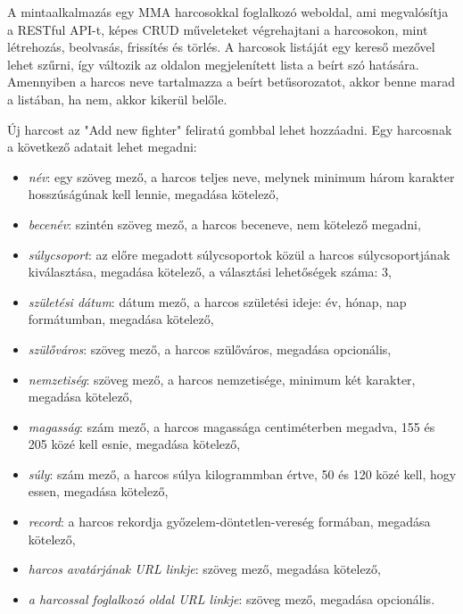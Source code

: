 





A mintaalkalmazás egy MMA harcosokkal foglalkozó weboldal, ami megvalósítja a RESTful API-t, képes CRUD műveleteket végrehajtani a harcosokon, mint létrehozás, beolvasás, frissítés és törlés. A harcosok listáját egy kereső mezővel lehet szűrni, így változik az oldalon megjelenített lista a beírt szó hatására. Amennyiben a harcos neve tartalmazza a beírt betűsorozatot, akkor benne marad a listában, ha nem, akkor kikerül belőle.

Új harcost az "Add new fighter" feliratú gombbal lehet hozzáadni. Egy harcosnak a következő adatait lehet megadni:

\begin{itemize}
\item \textit{név}: egy szöveg mező, a harcos teljes neve, melynek minimum három karakter hosszúságúnak kell lennie, megadása kötelező,
\item \textit{becenév}: szintén szöveg mező, a harcos beceneve, nem kötelező megadni,
\item \textit{súlycsoport}: az előre megadott súlycsoportok közül a harcos súlycsoportjának kiválasztása, megadása kötelező, a választási lehetőségek száma: 3,
\item \textit{születési dátum}: dátum mező, a harcos születési ideje: év, hónap, nap formátumban, megadása kötelező,
\item \textit{szülőváros}: szöveg mező, a harcos szülőváros, megadása opcionális,
\item \textit{nemzetiség}: szöveg mező, a harcos nemzetisége, minimum két karakter, megadása kötelező,
\item \textit{magasság}: szám mező, a harcos magassága centiméterben megadva, 155 és 205 közé kell esnie, megadása kötelező,
\item \textit{súly}: szám mező, a harcos súlya kilogrammban értve, 50 és 120 közé kell, hogy essen, megadása kötelező,
\item \textit{record}: a harcos rekordja győzelem-döntetlen-vereség formában, megadása kötelező,
\item \textit{harcos avatárjának URL linkje}: szöveg mező, megadása kötelező,
\item \textit{a harcossal foglalkozó oldal URL linkje}: szöveg mező, megadása opcionális.
\end{itemize}

